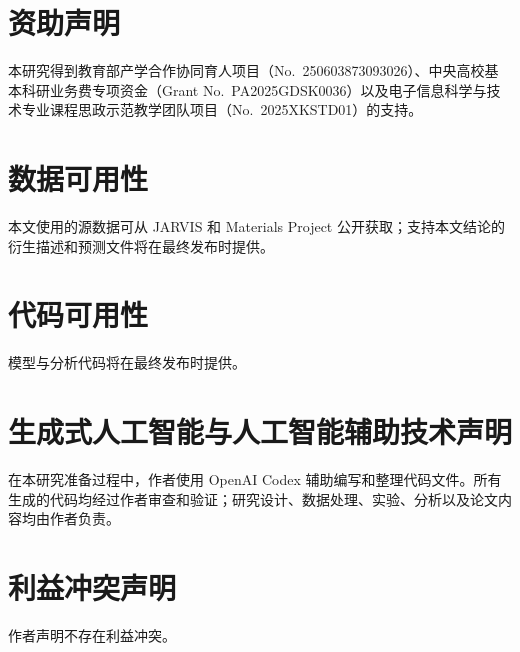 \documentclass[a4paper,fleqn]{cas-sc}
\begin{document}
\section*{资助声明}
本研究得到教育部产学合作协同育人项目（No.~250603873093026）、中央高校基本科研业务费专项资金（Grant No.~PA2025GDSK0036）以及电子信息科学与技术专业课程思政示范教学团队项目（No.~2025XKSTD01）的支持。
\section*{数据可用性}
本文使用的源数据可从 JARVIS 和 Materials Project 公开获取；支持本文结论的衍生描述和预测文件将在最终发布时提供。
\section*{代码可用性}
模型与分析代码将在最终发布时提供。
\section*{生成式人工智能与人工智能辅助技术声明}
在本研究准备过程中，作者使用 OpenAI Codex 辅助编写和整理代码文件。所有生成的代码均经过作者审查和验证；研究设计、数据处理、实验、分析以及论文内容均由作者负责。
\section*{利益冲突声明}
作者声明不存在利益冲突。


\end{document}
